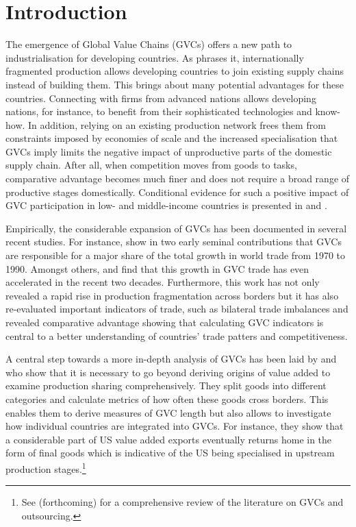 \documentclass[11pt,a4paper]{article}
\begin{document}
\section{Introduction}
The emergence of Global Value Chains (GVCs) offers a new path to industrialisation for developing countries. As \cite{riba12} phrases it, internationally fragmented production allows developing countries to join existing supply chains instead of building them. This brings about many potential advantages for these countries. Connecting with firms from advanced nations allows developing nations, for instance, to benefit from their sophisticated technologies and know-how. In addition, relying on an existing production network frees them from constraints imposed by economies of scale and the increased specialisation that GVCs imply limits the negative impact of unproductive parts of the domestic supply chain. After all, when competition moves from goods to tasks, comparative advantage becomes much finer and does not require a broad range of productive stages domestically. Conditional evidence for such a positive impact of GVC participation in low- and middle-income countries is presented in \citet{viku16} and \citet{unct13}.

Empirically, the considerable expansion of GVCs has been documented in several recent studies. For instance, \citet{dahuetal98, dahuetal01} show in two early seminal contributions that GVCs are responsible for a major share of the total growth in world trade from 1970 to 1990. Amongst others, \citet{rojoguno12a} and \citet{ribajalo13} find that this growth in GVC trade has even accelerated in the recent two decades. Furthermore, this work has not only revealed a rapid rise in production fragmentation across borders but it has also re-evaluated important indicators of trade, such as bilateral trade imbalances and revealed comparative advantage showing that calculating GVC indicators is central to a better understanding of countries' trade patters and competitiveness. 

A central step towards a more in-depth analysis of GVCs has been laid by \citet{rokoetal14} and \citet{zhwaetal13} who show that it is necessary to go beyond deriving origins of value added to examine production sharing comprehensively. They split goods into different categories and calculate metrics of how often these goods cross borders. This enables them to derive measures of GVC length but also allows to investigate how individual countries are integrated into GVCs. For instance, they show that a considerable part of US value added exports eventually returns home in the form of final goods which is indicative of the US being specialised in upstream production stages.\footnote{See \citeauthor{joamsoca15} (forthcoming) for a comprehensive review of the literature on GVCs and outsourcing.} 
\end{document}
